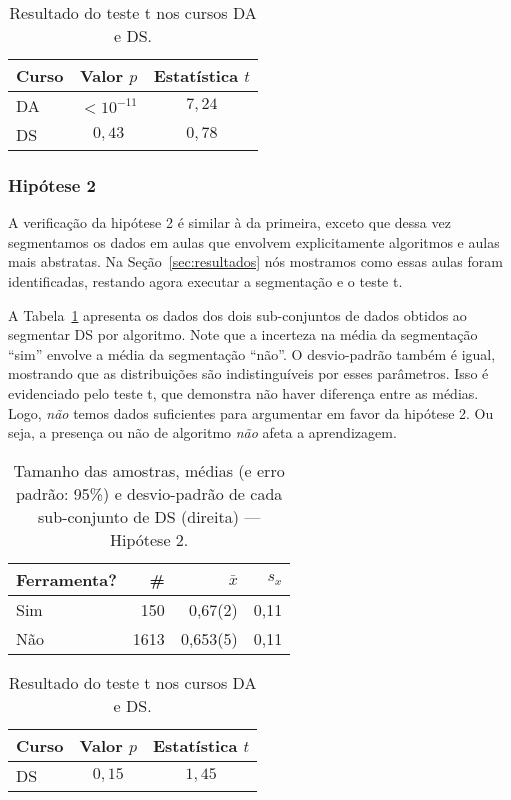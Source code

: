 \begin{table}
	\centering
	\caption{Resultado do teste t nos cursos DA e DS.}
	\begin{tabular}{lcc}
	\toprule
	Curso & Valor $p$   & Estatística $t$ \\
	\midrule
	DA    & $<10^{-11}$ & $7,24$ \\
	DS    & $0,43$      & $0,78$ \\ 
	\bottomrule
	\end{tabular}
\end{table}

\subsubsection{Hipótese 2}

A verificação da hipótese 2 é similar à da primeira, exceto que dessa vez segmentamos os dados em aulas que envolvem explicitamente algoritmos e aulas mais abstratas.
Na Seção~\ref{sec:resultados} nós mostramos como essas aulas foram identificadas, restando agora executar a segmentação e o teste t.

A Tabela~\ref{tab:hipotese2-subsets} apresenta os dados dos dois sub-conjuntos de dados obtidos ao segmentar DS por algoritmo. Note que a incerteza na média da segmentação ``sim'' envolve a média da segmentação ``não''.
O desvio-padrão também é igual, mostrando que as distribuições são indistinguíveis por esses parâmetros.
Isso é evidenciado pelo teste t, que demonstra não haver diferença entre as médias.
Logo, \emph{não} temos dados suficientes para argumentar em favor da hipótese 2.
Ou seja, a presença ou não de algoritmo \emph{não} afeta a aprendizagem.

\begin{table}
	\caption{Tamanho das amostras, médias (e erro padrão: 95\%) e desvio-padrão de cada sub-conjunto de DS (direita) --- Hipótese 2.}
	\label{tab:hipotese2-subsets}
	\begin{tabular}{lrrr}
		\toprule
		Ferramenta? & \# & $\bar{x}$ & $s_x$ \\
		\midrule
		Sim &  150 &  0,67(2) & 0,11 \\
		Não & 1613 & 0,653(5) & 0,11 \\
		\bottomrule
	\end{tabular}
\end{table}

\begin{table}
	\centering
	\caption{Resultado do teste t nos cursos DA e DS.}
	\begin{tabular}{lcc}
	\toprule
	Curso & Valor $p$   & Estatística $t$ \\
	\midrule
	DS    & $0,15$      & $1,45$ \\ 
	\bottomrule
	\end{tabular}
\end{table}

